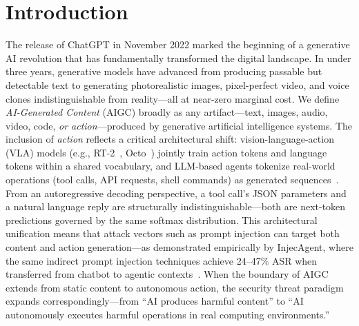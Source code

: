 
\section{Introduction}
\label{sec:introduction}


The release of ChatGPT in November 2022 marked the beginning of a generative AI revolution that has fundamentally transformed the digital landscape. In under three years, generative models have advanced from producing passable but detectable text to generating photorealistic images, pixel-perfect video, and voice clones indistinguishable from reality---all at near-zero marginal cost. We define \emph{AI-Generated Content} (AIGC) broadly as any artifact---text, images, audio, video, code, \emph{or action}---produced by generative artificial intelligence systems. The inclusion of \emph{action} reflects a critical architectural shift: vision-language-action (VLA) models (e.g., RT-2~\cite{brohan2023rt2}, Octo~\cite{team2024octo}) jointly train action tokens and language tokens within a shared vocabulary, and LLM-based agents tokenize real-world operations (tool calls, API requests, shell commands) as generated sequences~\cite{wang2024agentsurvey}. From an autoregressive decoding perspective, a tool call's JSON parameters and a natural language reply are structurally indistinguishable---both are next-token predictions governed by the same softmax distribution. This architectural unification means that attack vectors such as prompt injection can target both content and action generation---as demonstrated empirically by InjecAgent, where the same indirect prompt injection techniques achieve 24--47\% ASR when transferred from chatbot to agentic contexts~\cite{zhan2024injecagent}. When the boundary of AIGC extends from static content to autonomous action, the security threat paradigm expands correspondingly---from ``AI produces harmful content'' to ``AI autonomously executes harmful operations in real computing environments.''

